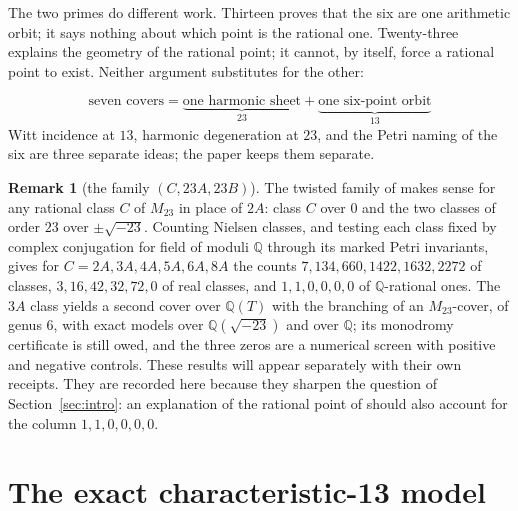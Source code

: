 \documentclass[11pt]{amsart}
\newif\ifrelqclosed
\newcommand{\QQ}{\mathbb{Q}}
\newcommand{\Mtw}{M_{23}}
\newcommand{\sqm}{\sqrt{-23}}
\theoremstyle{plain}
\theoremstyle{definition}
\newtheorem{remark}[theorem]{Remark}
\begin{document}
The two primes do different work. Thirteen proves that the six are
one arithmetic orbit; it says nothing about which point is the
rational one. Twenty-three explains the geometry of the rational
point; it cannot, by itself, force a rational point to exist. Neither
argument substitutes for the other:
\ifrelqclosed
\[
\boxed{\ \text{seven covers}
 =\underbrace{\text{one harmonic sheet}}_{23}
 +\underbrace{\text{one sextic orbit}}_{13,\ F(\sqm)}\ }
\]
And the naming of the six is a third kind of work again. It happens at
no prime: the object is a curve over $F(\sqm)$, and $13$ enters
Theorem~\ref{thm:relq} only to certify that its reduction is smooth and
to supply the monodromy of that reduction. Witt incidence at $13$,
harmonic degeneration at $23$, and the exact model over $F(\sqm)$ are
three separate ideas; the paper keeps them separate.
\else
\[
\boxed{\ \text{seven covers}
 =\underbrace{\text{one harmonic sheet}}_{23}
 +\underbrace{\text{one six-point orbit}}_{13}\ }
\]
Witt incidence at $13$, harmonic degeneration at $23$, and the Petri
naming of the six are three separate ideas; the paper keeps them
separate.
\fi

\begin{remark}[the family $(C,23A,23B)$]\label{rem:family}
The twisted family of \cite{HJLPPZ} makes sense for any rational
class $C$ of $\Mtw$ in place of $2A$: class $C$ over $0$ and the two
classes of order $23$ over $\pm\sqm$. Counting Nielsen classes, and
testing each class fixed by complex conjugation for field of moduli
$\QQ$ through its marked Petri invariants, gives for
$C=2A,3A,4A,5A,6A,8A$ the counts $7,134,660,1422,1632,2272$ of
classes, $3,16,42,32,72,0$ of real classes, and $1,1,0,0,0,0$ of
$\QQ$-rational ones. The $3A$ class yields a second cover over
$\QQ(T)$ with the branching of an $\Mtw$-cover, of genus $6$, with
exact models over $\QQ(\sqm)$ and over $\QQ$; its monodromy
certificate is still owed, and the three zeros are a numerical screen
with positive and negative controls. These results will appear
separately with their own receipts. They are recorded here because
they sharpen the question of Section~\ref{sec:intro}: an explanation
of the rational point of \cite{HJLPPZ} should also account for the
column $1,1,0,0,0,0$.
\end{remark}

\appendix

\section{The exact characteristic-13 model}\label{app:model}
\end{document}
